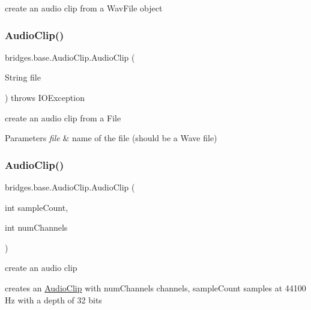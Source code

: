 create an audio clip from a Wav\+File object 

\mbox{\label{classbridges_1_1base_1_1_audio_clip_a70d5f6f10dad6da2f27bb04b7021e2fa}} 
\subsubsection{\texorpdfstring{Audio\+Clip()}{AudioClip()}\hspace{0.1cm}{\footnotesize\ttfamily [3/4]}}
{\footnotesize\ttfamily bridges.\+base.\+Audio\+Clip.\+Audio\+Clip (\begin{DoxyParamCaption}\item[{String}]{file }\end{DoxyParamCaption}) throws I\+O\+Exception}



create an audio clip from a File 


\begin{DoxyParams}{Parameters}
{\em file} & name of the file (should be a Wave file) \\
\hline
\end{DoxyParams}
\mbox{\label{classbridges_1_1base_1_1_audio_clip_aca2a5258c29b104bf8216ae5ec3c5938}} 
\subsubsection{\texorpdfstring{Audio\+Clip()}{AudioClip()}\hspace{0.1cm}{\footnotesize\ttfamily [4/4]}}
{\footnotesize\ttfamily bridges.\+base.\+Audio\+Clip.\+Audio\+Clip (\begin{DoxyParamCaption}\item[{int}]{sample\+Count,  }\item[{int}]{num\+Channels }\end{DoxyParamCaption})}



create an audio clip 

creates an \hyperlink{classbridges_1_1base_1_1_audio_clip}{Audio\+Clip} with num\+Channels channels, sample\+Count samples at 44100 Hz with a depth of 32 bits 

